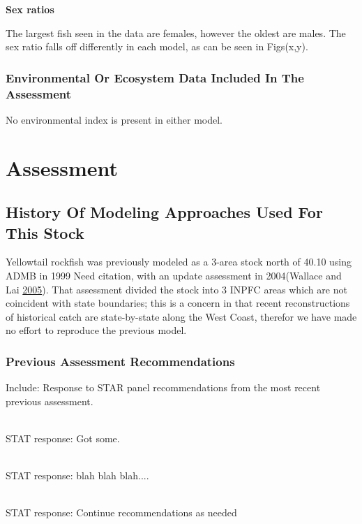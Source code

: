 \documentclass[12pt,]{article}
\begin{document}
\vspace{.5cm}

\textbf{Sex ratios}

The largest fish seen in the data are females, however the oldest are
males. The sex ratio falls off differently in each model, as can be seen
in Figs(x,y).

\subsubsection{Environmental Or Ecosystem Data Included In The
Assessment}\label{environmental-or-ecosystem-data-included-in-the-assessment}

No environmental index is present in either model.

\section{Assessment}\label{assessment}

\subsection{History Of Modeling Approaches Used For This
Stock}\label{history-of-modeling-approaches-used-for-this-stock}

Yellowtail rockfish was previously modeled as a 3-area stock north of
40.10 using ADMB in 1999 Need citation, with an update assessment in
2004(Wallace and Lai \protect\hyperlink{ref-Wallace2005}{2005}). That
assessment divided the stock into 3 INPFC areas which are not coincident
with state boundaries; this is a concern in that recent reconstructions
of historical catch are state-by-state along the West Coast, therefor we
have made no effort to reproduce the previous model.

\subsubsection{Previous Assessment
Recommendations}\label{previous-assessment-recommendations}

Include: Response to STAR panel recommendations from the most recent
previous assessment.

\begin{description}[style=unboxed]

  \item[Recommendation 1: More data needed.] \hfill \\

   STAT response: Got some.

\item[Recommendation 2: blah blah blah.] \hfill \\

  STAT response: blah blah blah....

\item[Recommendation 3: blah blah blah., etc.] \hfill \\

  STAT response: Continue recommendations as needed


\end{description}
\end{document}
